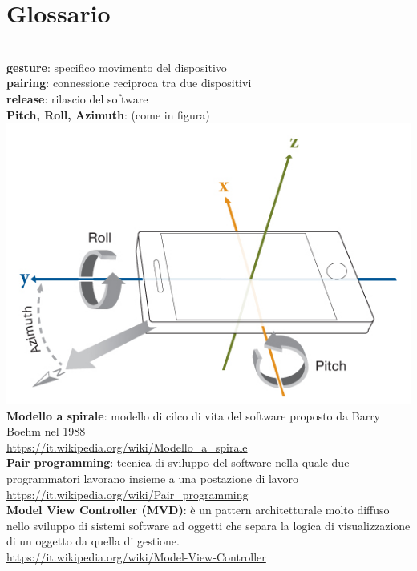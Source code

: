 \documentclass[a4paper,11pt]{article}
\begin{document}
\section{Glossario}
\ \\
\textbf{gesture}: specifico movimento del dispositivo \\ \label{gesture}\textbf{pairing}: connessione reciproca tra due dispositivi\\ \label{pairing}\textbf{release}: rilascio del software\\ \label{release}\textbf{Pitch, Roll, Azimuth}: (come in figura)\\\includegraphics[scale=0.5]{PitchRollAzimuth}\\ \label{pra}\textbf{Modello a spirale}: modello di cilco di vita del software proposto da Barry Boehm nel 1988 \\ \label{spirale}\url{https://it.wikipedia.org/wiki/Modello_a_spirale}\\\textbf{Pair programming}: tecnica di sviluppo del software nella quale due programmatori lavorano insieme a una postazione di lavoro \\ \label{pairp}\url{https://it.wikipedia.org/wiki/Pair_programming}\\\textbf{Model View Controller (MVD)}: è un pattern architetturale molto diffuso nello sviluppo di sistemi software ad oggetti che separa la logica di visualizzazione di un oggetto da quella di gestione.\\ \label{MVC}\url{https://it.wikipedia.org/wiki/Model-View-Controller}

  
\end{document}
